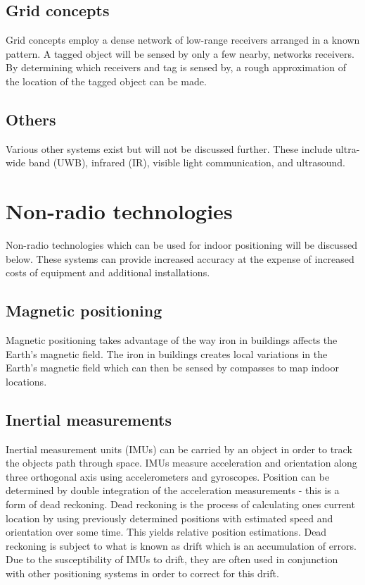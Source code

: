 \documentclass[11pt,a4paper]{report}
\begin{document}
	\subsection{Grid concepts}
		Grid concepts employ a dense network of low-range receivers arranged in a known pattern. A tagged object will be sensed by only a few nearby, networks receivers. By determining which receivers and tag is sensed by, a rough approximation of the location of the tagged object can be made.
	
	\subsection{Others}
		Various other systems exist but will not be discussed further. These include ultra-wide band (UWB), infrared (IR), visible light communication, and ultrasound.
	
	\section{Non-radio technologies}
		Non-radio technologies which can be used for indoor positioning will be discussed below. These systems can provide increased accuracy at the expense of increased costs of equipment and additional installations.
	
	\subsection{Magnetic positioning}
		Magnetic positioning takes advantage of the way iron in buildings affects the Earth's magnetic field. The iron in buildings creates local variations in the Earth's magnetic field which can then be sensed by compasses to map indoor locations.
		\cite{supreeth_sudhakaran_geospatial_2014}
	
	\subsection{Inertial measurements}
		Inertial measurement units (IMUs) can be carried by an object in order to track the objects path through space. IMUs measure acceleration and orientation along three orthogonal axis using accelerometers and gyroscopes. Position can be determined by double integration of the acceleration measurements - this is a form of dead reckoning. Dead reckoning is the process of calculating ones current location by using previously determined positions with estimated speed and orientation over some time. This yields relative position estimations. Dead reckoning is subject to what is known as drift which is an accumulation of errors. Due to the susceptibility of IMUs to drift, they are often used in conjunction with other positioning systems in order to correct for this drift.
\end{document}
